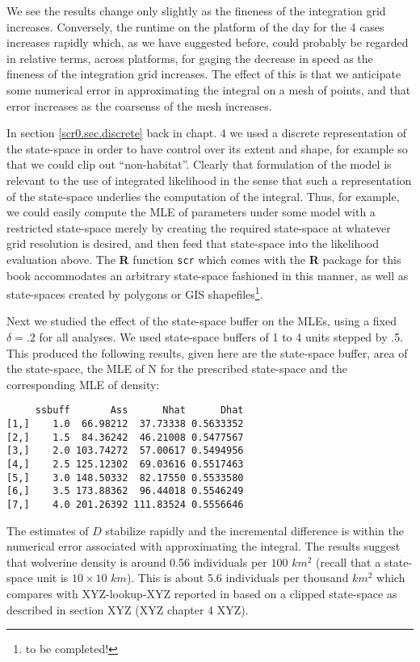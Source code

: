 We see the results change only slightly as the fineness of the
integration grid increases. Conversely, the runtime on the platform of
the day for the 4 cases increases rapidly 
which, as we have suggested before, could probably be regarded in
relative terms,  across platforms, for gaging the decrease in
speed as the fineness of the integration grid increases. The effect of
this is that we anticipate some numerical error in approximating the
integral on a mesh of points, and that error increases as the
coarsenss of the mesh increases. 

In section \ref{scr0.sec.discrete} 
back in chapt. 4 we used a discrete representation of
the state-space in order to have control over its extent and shape,
for example so that we could clip out ``non-habitat''. Clearly that
formulation of the model is relevant to the use of integrated
likelihood in the sense that such a representation of the state-space
underlies the computation of the integral. Thus, for example, we could
easily compute the MLE of parameters under some model with a
restricted state-space merely by creating the required state-space at
whatever grid resolution is desired, and then feed that state-space
into the likelihood evaluation above. The {\bf R} function \mbox{\tt scr}
which comes with the {\bf R} package for this book accommodates an
arbitrary state-space fashioned in this manner, as well as
state-spaces created by polygons or GIS shapefiles\footnote{to be completed!}.


Next we studied the effect of the state-space buffer on the MLEs,
using a fixed $\delta = .2$ for all analyses. We used state-space buffers
of 1 to 4 units stepped by .5. This produced the following results,
given here are the state-space buffer, area of the state-space, the
MLE of N for the prescribed state-space and the corresponding MLE of
density:
\begin{verbatim}
     ssbuff       Ass      Nhat      Dhat
[1,]    1.0  66.98212  37.73338 0.5633352
[2,]    1.5  84.36242  46.21008 0.5477567
[3,]    2.0 103.74272  57.00617 0.5494956
[4,]    2.5 125.12302  69.03616 0.5517463
[5,]    3.0 148.50332  82.17550 0.5533580
[6,]    3.5 173.88362  96.44018 0.5546249
[7,]    4.0 201.26392 111.83524 0.5556646
\end{verbatim}
The estimates of $D$ stabilize rapidly and the incremental difference
is within the numerical error associated with approximating the
integral.  The results suggest that wolverine density is around 0.56 individuals
per $100$ $km^2$ (recall that a state-space unit is $10 \times 10$ $km$).  This is about
5.6 individuals per thousand $km^2$ which compares with XYZ-lookup-XYZ
reported in \citet{royle_etal:2011jwm} based on a clipped state-space as
described in section XYZ (XYZ chapter 4 XYZ).



